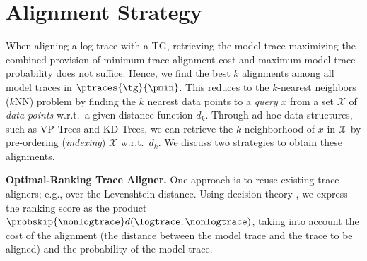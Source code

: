 \section{Alignment Strategy}\label{subsec:as}
When aligning a log trace with a TG, retrieving the model trace maximizing the combined provision of minimum trace alignment cost 
and maximum model trace probability does not suffice.
Hence, we find the best $k$ alignments among all  model traces in $\ptraces{\tg}{\pmin}$. This reduces to the
$k$-nearest neighbors ($k$NN) problem by finding the $k$ nearest data points to a \textit{query} $x$ from a set 
$\mathcal{X}$ of \textit{data points} w.r.t.\ a given distance function $d_k$. Through ad-hoc data structures, such as VP-Trees 
and KD-Trees, %
we can retrieve the $k$-neighborhood of $x$ in $\mathcal{X}$ by pre-ordering (\textit{indexing}) $\mathcal{X}$ w.r.t.\ $d_k$. 
%
We discuss two strategies to obtain these
alignments.

\smallskip
\noindent
\textbf{Optimal-Ranking Trace Aligner.}
One approach is to reuse existing trace aligners; e.g., \cite{DBLP:conf/edoc/AdriansyahDA11,LeoniM17} over the Levenshtein 
distance.
Using decision theory \cite{dectheor}, we express the ranking score as the product 
$\probskip{\nonlogtrace} d(\logtrace,\nonlogtrace)$, taking into account the cost of the alignment (the distance between 
the model trace and the trace to be aligned) and the probability of the model trace.

